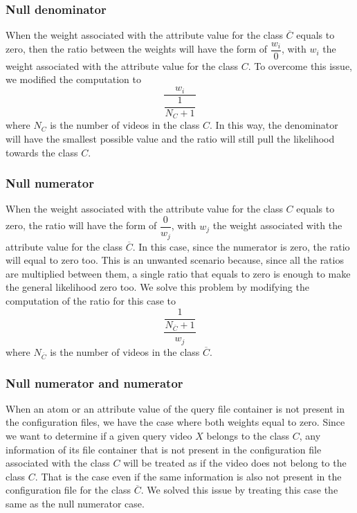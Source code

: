 \subsubsection*{Null denominator}

When the weight associated with the attribute value for the class $\overline{C}$ equals to zero, then the ratio between the weights will have the form of $ \dfrac{w_{i}}{0} $, with $w_{i}$ the weight associated with the attribute value for the class $C$. To overcome this issue, we modified the computation to $$ \dfrac{w_{i}}{\dfrac{1}{N_{C} + 1}} $$ where $N_{C}$ is the number of videos in the class $C$. In this way, the denominator will have the smallest possible value and the ratio will still pull the likelihood towards the class $C$.

\subsubsection*{Null numerator}

When the weight associated with the attribute value for the class $C$ equals to zero, the ratio will have the form of $ \dfrac{0}{w_{j}} $, with $w_{j}$ the weight associated with the attribute value for the class $\overline{C}$. In this case, since the numerator is zero, the ratio will equal to zero too. This is an unwanted scenario because, since all the ratios are multiplied between them, a single ratio that equals to zero is enough to make the general likelihood zero too. We solve this problem by modifying the computation of the ratio for this case to $$ \dfrac{\dfrac{1}{N_{\overline{C}} + 1}}{w_{j}} $$ where $N_{\overline{C}}$ is the number of videos in the class $\overline{C}$.

\subsubsection*{Null numerator and numerator}

When an atom or an attribute value of the query file container is not present in the configuration files, we have the case where both weights equal to zero. Since we want to determine if a given query video $X$ belongs to the class $C$, any information of its file container that is not present in the configuration file associated with the class $C$ will be treated as if the video does not belong to the class $C$. That is the case even if the same information is also not present in the configuration file for the class $\overline{C}$. We solved this issue by treating this case the same as the null numerator case.

